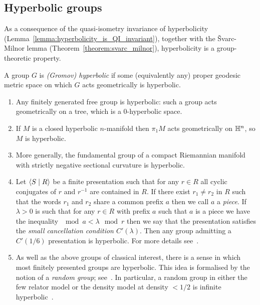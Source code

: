 \subsection{Hyperbolic groups}

As a consequence of the quasi-isometry invariance of hyperbolicity (Lemma~\ref{lemma:hyperbolicity_is_QI_invariant}), together with the \v{S}varc-Milnor lemma (Theorem~\ref{theorem:svarc_milnor}), hyperbolicity is a group-theoretic property.

\begin{definition}\cite{gromov87}
  A group $G$ is \emph{(Gromov) hyperbolic} if some (equivalently any) proper geodesic metric space on which $G$ acts geometrically is hyperbolic.
\end{definition}

\begin{example}
  \begin{enumerate}
    \item Any finitely generated free group is hyperbolic: such a group acts geometrically on a tree, which is a $0$-hyperbolic space.
    \item If $M$ is a closed hyperbolic $n$-manifold then $\pi_1M$ acts geometrically on $\mathbb{H}^n$, so $M$ is hyperbolic.
    \item More generally, the fundamental group of a compact Riemannian manifold with strictly negative sectional curvature is hyperbolic.
    \item Let $\langle S \mid R\rangle$ be a finite presentation such that for any $r \in R$ all cyclic conjugates of $r$ and $r^{-1}$ are contained in $R$.
      If there exist $r_1 \neq r_2$ in $R$ such that the words $r_1$ and $r_2$ share a common prefix $a$ then we call $a$ a \emph{piece}.
      If $\lambda > 0$ is such that for any $r \in R$ with prefix $a$ such that $a$ is a piece we have the inequality $\mod{a} < \lambda\mod{r}$ then we say that the presentation satisfies the \emph{small cancellation condition $C'(\lambda)$}.
      Then any group admitting a $C'(1/6)$ presentation is hyperbolic.
      For more details see~\cite{lyndonschupp77}.
    \item As well as the above groups of classical interest, there is a sense in which most finitely presented groups are hyperbolic.
      This idea is formalised by the notion of a \emph{random group}; see~\cite{gromov03}.
      In particular, a random group in either the few relator model or the density model at density $< 1/2$ is infinite hyperbolic~\cite{gromov87,gromov92}.
  \end{enumerate}
\end{example}

